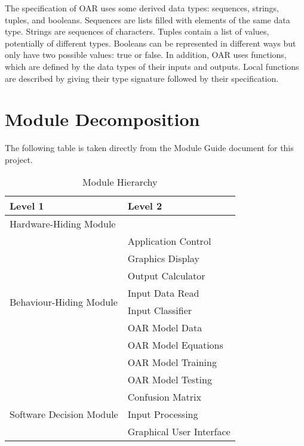 \documentclass[12pt, titlepage]{article}
\begin{document}
\noindent
The specification of OAR uses some derived data types: sequences, strings,
tuples, and booleans. Sequences are lists filled with elements of the same data type. Strings
are sequences of characters. Tuples contain a list of values, potentially of
different types. Booleans can be represented in different ways but only have two possible values: true or false. In addition, 
OAR uses functions, which
are defined by the data types of their inputs and outputs. Local functions are
described by giving their type signature followed by their specification.

\section{Module Decomposition}

The following table is taken directly from the Module Guide document for this project.

\begin{table}[h!]
  \centering
  \begin{tabular}{p{} p{}}
  \toprule
  \textbf{Level 1} & \textbf{Level 2}\\
  \midrule
    
  {Hardware-Hiding Module} & ~\\
  \midrule
    
  \multirow{8}{0.3\textwidth}{Behaviour-Hiding Module}
    & Application Control \\
    & Graphics Display \\
    & Output Calculator \\
    & Input Data Read \\
    & Input Classifier \\
    & OAR Model Data \\
    & OAR Model Equations \\
    & OAR Model Training\\
    & OAR Model Testing\\
    \midrule
    
    \multirow{3}{0.3\textwidth}{Software Decision Module}
      & Confusion Matrix\\
      & Input Processing\\
      & Graphical User Interface \\
    \bottomrule
    
    \end{tabular}
  \caption{Module Hierarchy}
  \label{TblMH}
  \end{table}
  
\end{document}
